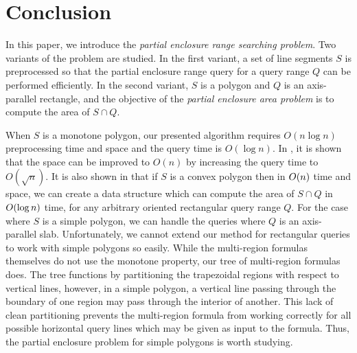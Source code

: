 \section{Conclusion}
\label{conclusion}

In this paper, we introduce the \emph{partial enclosure range searching 
problem}.
Two variants of the problem are studied. In the first variant, 
a set of line segments $S$ is preprocessed so that the partial enclosure range
query for a query range $Q$ can be performed efficiently. In the second 
variant, 
$S$ is a polygon and $Q$ is an axis-parallel rectangle, and the objective of 
the 
\emph{partial enclosure area problem} is to compute the area of $S \cap Q$. 

When $S$ is a monotone polygon, our presented algorithm requires $O(n\log n)$ 
preprocessing 
time and space and the query time is $O(\log n)$. In \cite{BINT}, it is shown 
that the space can be 
improved to $O(n)$ by increasing the query time to $O(\sqrt{n})$. It is also 
shown in \cite{BINT} that 
if $S$ is a convex polygon then in $O\!\left(n\right)$ time and space, we can create a 
data structure which 
can compute the area of $S \cap Q$ in $O\!\left(\log{n}\right)$ time, for any arbitrary 
oriented rectangular 
query range $Q$. For the case where $S$ is a simple polygon, we can handle the 
queries where $Q$ is an 
axis-parallel slab. Unfortunately, we cannot extend our method for rectangular 
queries to work with simple polygons so easily.
While the multi-region formulas themselves do not use the monotone property, our 
tree of multi-region formulas does. 
The tree functions by partitioning the trapezoidal regions with respect to 
vertical lines, however, in a simple polygon, a vertical line passing through 
the boundary of one region may pass through the interior of another. 
This lack of clean partitioning prevents the multi-region formula from working 
correctly for all possible horizontal query lines which may be given as input to 
the formula. Thus, the partial enclosure problem for simple polygons is worth studying. 
